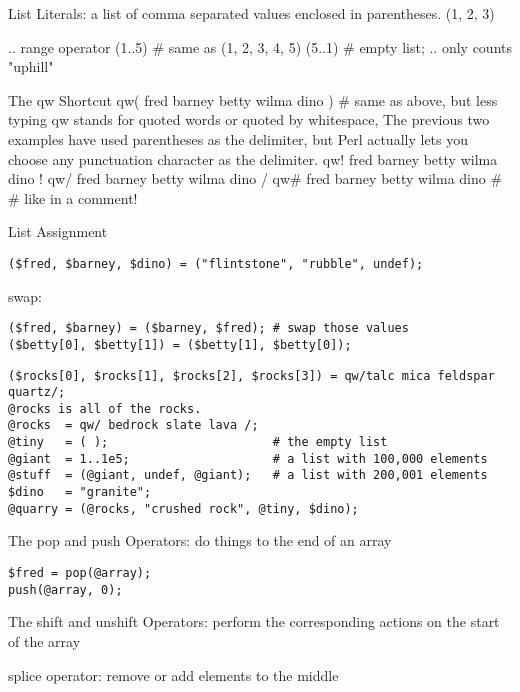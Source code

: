\documentclass[12pt]{article}
\begin{document}
\begin{enumerate}
List Literals:
a list of comma separated values enclosed in parentheses.
(1, 2, 3)

.. range operator
(1..5) \# same as (1, 2, 3, 4, 5)
(5..1) \# empty list; .. only counts "uphill"

The qw Shortcut
qw( fred barney betty wilma dino ) # same as above, but less typing
qw stands for quoted words or quoted by whitespace,
The previous two examples have used parentheses as the delimiter, but Perl actually lets you choose any punctuation character as the delimiter. 
qw! fred barney betty wilma dino !
qw/ fred barney betty wilma dino /
qw# fred barney betty wilma dino # # like in a comment!

List Assignment
\begin{verbatim}
($fred, $barney, $dino) = ("flintstone", "rubble", undef);
\end{verbatim}

swap:
\begin{verbatim}
($fred, $barney) = ($barney, $fred); # swap those values
($betty[0], $betty[1]) = ($betty[1], $betty[0]);
\end{verbatim}

\begin{verbatim}
($rocks[0], $rocks[1], $rocks[2], $rocks[3]) = qw/talc mica feldspar quartz/;
@rocks is all of the rocks.
@rocks  = qw/ bedrock slate lava /;
@tiny   = ( );                       # the empty list
@giant  = 1..1e5;                    # a list with 100,000 elements
@stuff  = (@giant, undef, @giant);   # a list with 200,001 elements
$dino   = "granite";
@quarry = (@rocks, "crushed rock", @tiny, $dino);
\end{verbatim}

The pop and push Operators: do things to the end of an array
\begin{verbatim}
$fred = pop(@array);
push(@array, 0);
\end{verbatim}

The shift and unshift Operators: perform the corresponding actions on
the start of the array

splice operator: remove or add elements to the middle


\end{enumerate}


%
%
\end{document}
